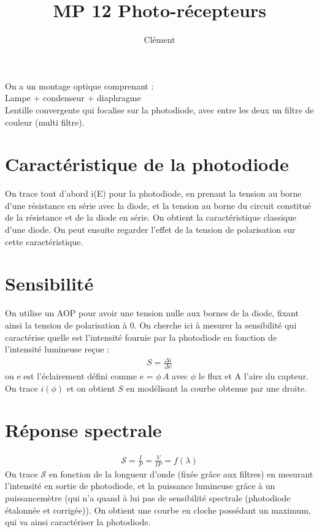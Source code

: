 \documentclass[12pt,prb,aps,epsf]{report}
\begin{document}
	
	\title{MP 12 Photo-récepteurs}
	\author{Clément}
	
	\maketitle
	
	\tableofcontents
	
	\pagebreak
	
	On a un montage optique comprenant :\\
	Lampe + condenseur + diaphragme\\
	Lentille convergente qui focalise sur la photodiode, avec entre les deux un filtre de couleur (multi filtre).\\
	
\section{Caractéristique de la photodiode}
On trace tout d'abord i(E) pour la photodiode, en prenant la tension au borne d'une résistance en série avec la diode, et la tension au borne du circuit constitué de la résistance et de la diode en série. On obtient la caractéristique classique d'une diode. On peut ensuite regarder l'effet de la tension de polarisation sur cette caractéristique.

\section{Sensibilité}
On utilise un AOP pour avoir une tension nulle aux bornes de la diode, fixant ainsi la tension de polarisation à 0. On cherche ici à mesurer la sensibilité qui caractérise quelle est l'intensité fournie par la photodiode en fonction de l'intensité lumineuse reçue :
\begin{eqnarray}
S = \frac{\Delta i}{\Delta e}
\end{eqnarray}
ou  e est l'éclairement défini comme e = $\phi\,A$ avec $\phi$ le flux et A l'aire du capteur. On trace $i(\phi)$ et on obtient $S$ en modélisant la courbe obtenue par une droite.

\section{Réponse spectrale}

\begin{eqnarray}
\mathcal{S} = \frac{I}{P} = \frac{V}{IP} = f(\lambda)
\end{eqnarray}
On trace $\mathcal{S}$ en fonction de la longueur d'onde (fixée grâce aux filtres) en mesurant l'intensité en sortie de photodiode, et la puissance lumineuse grâce à un puissancemètre (qui n'a quand à lui pas de sensibilité spectrale (photodiode étalonnée et corrigée)). On obtient une courbe en cloche possédant un maximum, qui va ainsi caractériser la photodiode.
\end{document}
